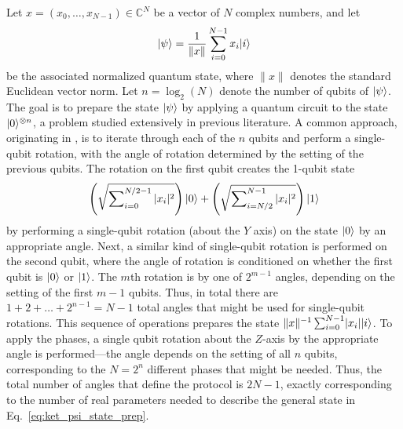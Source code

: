 \begin{refsection}
Let $x = (x_0,\ldots,x_{N-1}) \in \mathbb{C}^N$ be a vector of $N$ complex numbers, and let
\begin{equation}\label{eq:ket_psi_state_prep}
\lvert\psi\rangle = \frac{1}{\lVert x \rVert}\sum_{i=0}^{N-1} x_i \lvert i\rangle
\end{equation}
be the associated normalized quantum state, where $\lVert x \rVert$ denotes the standard Euclidean vector norm. Let $n=\log_2(N)$ denote the number of qubits of $\lvert\psi\rangle$. The goal is to prepare the state $\lvert\psi\rangle$ by applying a quantum circuit to the state $\lvert0\rangle^{\otimes n}$, a problem studied extensively in previous literature. A common approach, originating in \cite{grover2002SuperposEffIntegrProbDistr}, is to iterate through each of the $n$ qubits and perform a single-qubit rotation, with the angle of rotation determined by the setting of the previous qubits. The rotation on the first qubit creates the 1-qubit state
\begin{equation}
    \left(\sqrt{\sum\nolimits_{i=0}^{N/2-1} |x_i|^2 }\right)\lvert0\rangle + \left(\sqrt{\sum\nolimits_{i=N/2}^{N-1} |x_i|^2 }\right) \lvert1\rangle
\end{equation}
by performing a single-qubit rotation (about the $Y$ axis) on the state $\lvert0\rangle$ by an appropriate angle. Next, a similar kind of single-qubit rotation is performed on the second qubit, where the angle of rotation is conditioned on whether the first qubit is $\lvert0\rangle$ or $\lvert1\rangle$. The $m$th rotation is by one of $2^{m-1}$ angles, depending on the setting of the first $m-1$ qubits. Thus, in total there are $1+2+\ldots+2^{n-1} = N-1$ total angles that might be used for single-qubit rotations. This sequence of operations prepares the state $\lVert 
x\rVert^{-1}\sum_{i=0}^{N-1}\lvert x_i \rvert \lvert i\rangle$. To apply the phases, a single qubit rotation about the $Z$-axis by the appropriate angle is performed---the angle depends on the setting of all $n$ qubits, corresponding to the $N=2^n$ different phases that might be needed. Thus, the total number of angles that define the protocol is $2N-1$, exactly corresponding to the number of real parameters needed to describe the general state in Eq.~\eqref{eq:ket_psi_state_prep}.


\end{refsection}
